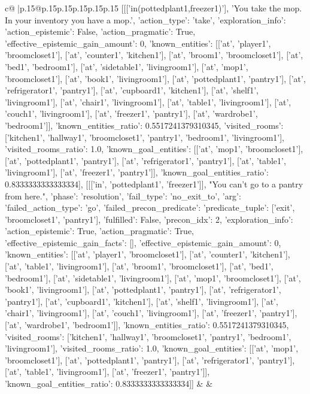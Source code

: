 \documentclass{article}
\begin{document}
{\begin{supertabular}{c@{$\;$}|p{.15\linewidth}@{}p{.15\linewidth}p{.15\linewidth}p{.15\linewidth}p{.15\linewidth}p{.15\linewidth}}
{{{	 [[['in(pottedplant1,freezer1)'], 'You take the mop. In your inventory you have a mop.', {'action_type': 'take', 'exploration_info': {'action_epistemic': False, 'action_pragmatic': True, 'effective_epistemic_gain_amount': 0, 'known_entities': [['at', 'player1', 'broomcloset1'], ['at', 'counter1', 'kitchen1'], ['at', 'broom1', 'broomcloset1'], ['at', 'bed1', 'bedroom1'], ['at', 'sidetable1', 'livingroom1'], ['at', 'mop1', 'broomcloset1'], ['at', 'book1', 'livingroom1'], ['at', 'pottedplant1', 'pantry1'], ['at', 'refrigerator1', 'pantry1'], ['at', 'cupboard1', 'kitchen1'], ['at', 'shelf1', 'livingroom1'], ['at', 'chair1', 'livingroom1'], ['at', 'table1', 'livingroom1'], ['at', 'couch1', 'livingroom1'], ['at', 'freezer1', 'pantry1'], ['at', 'wardrobe1', 'bedroom1']], 'known_entities_ratio': 0.5517241379310345, 'visited_rooms': ['kitchen1', 'hallway1', 'broomcloset1', 'pantry1', 'bedroom1', 'livingroom1'], 'visited_rooms_ratio': 1.0, 'known_goal_entities': [['at', 'mop1', 'broomcloset1'], ['at', 'pottedplant1', 'pantry1'], ['at', 'refrigerator1', 'pantry1'], ['at', 'table1', 'livingroom1'], ['at', 'freezer1', 'pantry1']], 'known_goal_entities_ratio': 0.8333333333333334}}], [[['in', 'pottedplant1', 'freezer1']], "You can't go to a pantry from here.", {'phase': 'resolution', 'fail_type': 'no_exit_to', 'arg': {'failed_action_type': 'go', 'failed_precon_predicate': {'predicate_tuple': ['exit', 'broomcloset1', 'pantry1'], 'fulfilled': False, 'precon_idx': 2}}, 'exploration_info': {'action_epistemic': True, 'action_pragmatic': True, 'effective_epistemic_gain_facts': [], 'effective_epistemic_gain_amount': 0, 'known_entities': [['at', 'player1', 'broomcloset1'], ['at', 'counter1', 'kitchen1'], ['at', 'table1', 'livingroom1'], ['at', 'broom1', 'broomcloset1'], ['at', 'bed1', 'bedroom1'], ['at', 'sidetable1', 'livingroom1'], ['at', 'mop1', 'broomcloset1'], ['at', 'book1', 'livingroom1'], ['at', 'pottedplant1', 'pantry1'], ['at', 'refrigerator1', 'pantry1'], ['at', 'cupboard1', 'kitchen1'], ['at', 'shelf1', 'livingroom1'], ['at', 'chair1', 'livingroom1'], ['at', 'couch1', 'livingroom1'], ['at', 'freezer1', 'pantry1'], ['at', 'wardrobe1', 'bedroom1']], 'known_entities_ratio': 0.5517241379310345, 'visited_rooms': ['kitchen1', 'hallway1', 'broomcloset1', 'pantry1', 'bedroom1', 'livingroom1'], 'visited_rooms_ratio': 1.0, 'known_goal_entities': [['at', 'mop1', 'broomcloset1'], ['at', 'pottedplant1', 'pantry1'], ['at', 'refrigerator1', 'pantry1'], ['at', 'table1', 'livingroom1'], ['at', 'freezer1', 'pantry1']], 'known_goal_entities_ratio': 0.8333333333333334}}]] 
	  } 
	   } 
	   } 
	 & & \\ 
 


\end{supertabular}}
\end{document}
